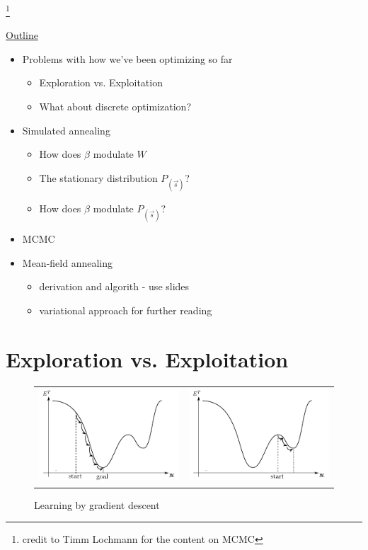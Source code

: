 
\footnote{credit to Timm Lochmann for the content on MCMC}

\begin{frame}
\underline{Outline}
\begin{itemize}
\item Problems with how we've been optimizing so far
 \begin{itemize}
 \item Exploration vs. Exploitation
 \item What about discrete optimization?
 \end{itemize}
 \item Simulated annealing
 \begin{itemize}
 \item How does $\beta$ modulate $W$
 \item The stationary distribution $P_{(\vec s)}$?
 \item How does $\beta$ modulate $P_{(\vec s)}$?
 \end{itemize}
 \item MCMC
 \item Mean-field annealing
 \begin{itemize}
     \item derivation and algorith - use slides
     \item variational approach for further reading
 \end{itemize}
\end{itemize}
\end{frame}

\section{Exploration vs. Exploitation}
\begin{frame}

\begin{figure}[ht]
  \centering
  \begin{tabular}{c c}
      \includegraphics[height=3.5cm]{img/gradient-descent.pdf} &
      \includegraphics[height=3.5cm]{img/gradient-descent_local.pdf}
  \end{tabular}
  \caption{Learning by gradient descent}\label{fig:graddescent}
\end{figure}

\end{frame}

